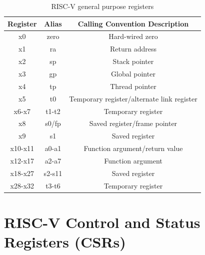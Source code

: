 \begin{table}
  \centering
  \begin{tabular}{|c|c|c|}
    \hline
    \textbf{Register} & \textbf{Alias} & \textbf{Calling Convention Description}    \\
    \hline
    x0                & zero           & Hard-wired zero                            \\
    \hline
    x1                & ra             & Return address                             \\
    \hline
    x2                & sp             & Stack pointer                              \\
    \hline
    x3                & gp             & Global pointer                             \\
    \hline
    x4                & tp             & Thread pointer                             \\
    \hline
    x5                & t0             & Temporary register/alternate link register \\
    \hline
    x6-x7             & t1-t2          & Temporary register                         \\
    \hline
    x8                & s0/fp          & Saved register/frame pointer               \\
    \hline
    x9                & s1             & Saved register                             \\
    \hline
    x10-x11           & a0-a1          & Function argument/return value             \\
    \hline
    x12-x17           & a2-a7          & Function argument                          \\
    \hline
    x18-x27           & s2-s11         & Saved register                             \\
    \hline
    x28-x32           & t3-t6          & Temporary register                         \\
    \hline
  \end{tabular}
  \caption{RISC-V general purpose registers}
  \label{tab:registers}
\end{table}

\section{RISC-V Control and Status Registers (CSRs)}
\label{sec:riscv_csrs}


